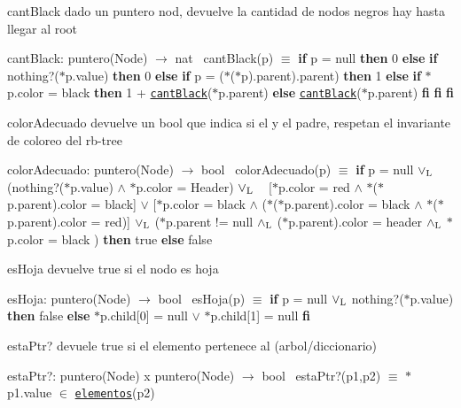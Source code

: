\begin{DoxyParagraph}{cant\+Black}
dado un puntero nod, devuelve la cantidad de nodos negros hay hasta llegar al root

cant\+Black\+: puntero(\+Node) $\to$ nat~\newline
 cant\+Black(p) $\equiv$ {\bfseries if} p = null {\bfseries then} 0 {\bfseries else} {\bfseries if} nothing?($\ast$p.value) {\bfseries then} 0 {\bfseries else} {\bfseries if} p = ($\ast$($\ast$p).parent).parent) {\bfseries then} 1 {\bfseries else} {\bfseries if} $\ast$p.color = black {\bfseries then} 1 + \href{axiomas.html#cantBlack}{\tt cant\+Black}($\ast$p.parent) {\bfseries else} \href{axiomas.html#cantBlack}{\tt cant\+Black}($\ast$p.parent) {\bfseries fi} {\bfseries fi} {\bfseries fi} 
\end{DoxyParagraph}


\begin{DoxyParagraph}{color\+Adecuado}
devuelve un bool que indica si el y el padre, respetan el invariante de coloreo del rb-\/tree

color\+Adecuado\+: puntero(\+Node) $\to$ bool~\newline
 color\+Adecuado(p) $\equiv$ {\bfseries if} p = null $\lor_{\rm L}$ (nothing?($\ast$p.value) $\land$ $\ast$p.color = Header) $\lor_{\rm L}$ ~\newline
 \mbox{[}$\ast$p.color = red $\land$ $\ast$($\ast$p.parent).color = black\mbox{]} $\lor$ \mbox{[}$\ast$p.color = black $\land$ ($\ast$($\ast$p.parent).color = black $\land$ $\ast$($\ast$p.parent).color = red)\mbox{]} $\lor_{\rm L}$ ($\ast$p.parent != null $\land_{\rm L}$ ($\ast$p.parent).color = header $\land_{\rm L}$ $\ast$p.color = black ) {\bfseries then} true {\bfseries else} false 
\end{DoxyParagraph}


\begin{DoxyParagraph}{es\+Hoja}
devuelve true si el nodo es hoja

es\+Hoja\+: puntero(\+Node) $\to$ bool~\newline
 es\+Hoja(p) $\equiv$ {\bfseries if} p = null $\lor_{\rm L}$ nothing?($\ast$p.value) {\bfseries then} false {\bfseries else} $\ast$p.child\mbox{[}0\mbox{]} = null $\lor$ $\ast$p.child\mbox{[}1\mbox{]} = null {\bfseries fi} 
\end{DoxyParagraph}


\begin{DoxyParagraph}{esta\+Ptr?}
devuele true si el elemento pertenece al (arbol/diccionario)

esta\+Ptr?\+: puntero(\+Node) x puntero(\+Node) $\to$ bool~\newline
 esta\+Ptr?(p1,p2) $\equiv$ $\ast$p1.value $\in$ \href{axiomas.html#elementos}{\tt elementos}(p2) 
\end{DoxyParagraph}


